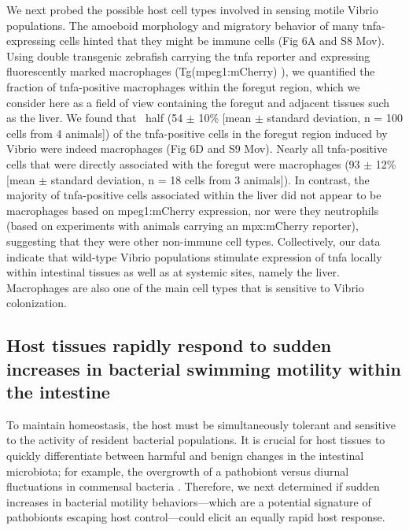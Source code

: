 We next probed the possible host cell types involved in sensing motile Vibrio populations. The amoeboid morphology and migratory behavior of many tnfa-expressing cells hinted that they might be immune cells (Fig 6A and S8 Mov). Using double transgenic zebrafish carrying the tnfa reporter and expressing fluorescently marked macrophages (Tg(mpeg1:mCherry) \cite{ellett_mpeg1_2011}), we quantified the fraction of tnfa-positive macrophages within the foregut region, which we consider here as a field of view containing the foregut and adjacent tissues such as the liver. We found that ~half (54 $\pm$ 10\% [mean $\pm$ standard deviation, n = 100 cells from 4 animals]) of the tnfa-positive cells in the foregut region induced by Vibrio were indeed macrophages (Fig 6D and S9 Mov). Nearly all tnfa-positive cells that were directly associated with the foregut were macrophages (93 $\pm$ 12\% [mean $\pm$ standard deviation, n = 18 cells from 3 animals]). In contrast, the majority of tnfa-positive cells associated within the liver did not appear to be macrophages based on mpeg1:mCherry expression, nor were they neutrophils (based on experiments with animals carrying an mpx:mCherry reporter), suggesting that they were other non-immune cell types. Collectively, our data indicate that wild-type Vibrio populations stimulate expression of tnfa locally within intestinal tissues as well as at systemic sites, namely the liver. Macrophages are also one of the main cell types that is sensitive to Vibrio colonization.


\subsection{Host tissues rapidly respond to sudden increases in bacterial swimming motility within the intestine} 
To maintain homeostasis, the host must be simultaneously tolerant and sensitive to the activity of resident bacterial populations. It is crucial for host tissues to quickly differentiate between harmful and benign changes in the intestinal microbiota; for example, the overgrowth of a pathobiont versus diurnal fluctuations in commensal bacteria \cite{thaiss_microbiota_2016}. Therefore, we next determined if sudden increases in bacterial motility behaviors—which are a potential signature of pathobionts escaping host control—could elicit an equally rapid host response. 

